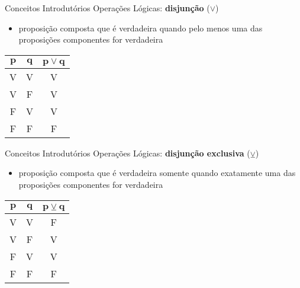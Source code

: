 \begin{frame}[t]{Conceitos Introdutórios} %
	Operações Lógicas: {\bf disjunção} ($\vee$)
	\begin{itemize}
	  \item proposição composta que é verdadeira quando pelo menos uma das proposições componentes for verdadeira
	\end{itemize}

	\begin{center}	
	\begin{tabular}{|c|c|c|}
	\hline
	$\mathbf{p}$ & $\mathbf{q}$ & $\mathbf{p \vee q}$ \\
	\hline
	V & V & V \\
	\hline
	V & F & V \\
	\hline
	F & V & V \\
	\hline
	F & F & F \\
	\hline
	\end{tabular}
	\end{center}
\end{frame}

\begin{frame}[t]{Conceitos Introdutórios} %
	Operações Lógicas: {\bf disjunção exclusiva} ($\veebar$)
	\begin{itemize}
	  \item proposição composta que é verdadeira somente quando exatamente uma das proposições componentes for verdadeira
	\end{itemize}

	\begin{center}	
	\begin{tabular}{|c|c|c|}
	\hline
	$\mathbf{p}$ & $\mathbf{q}$ & $\mathbf{p \veebar q}$ \\
	\hline
	V & V & F \\
	\hline
	V & F & V \\
	\hline
	F & V & V \\
	\hline
	F & F & F \\
	\hline
	\end{tabular}
	\end{center}
\end{frame}

